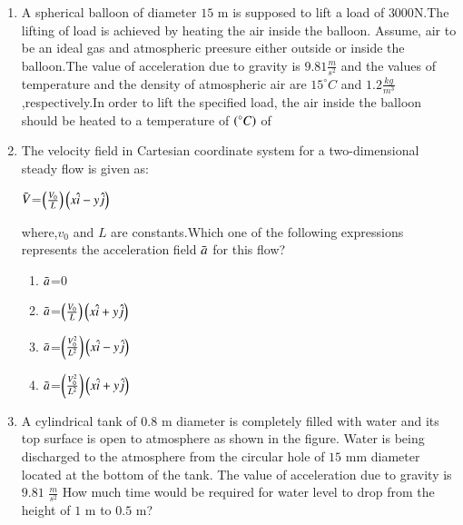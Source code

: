 \documentclass[journal]{IEEEtran}
\begin{document}
\begin{enumerate}[start=14]
    \item A spherical balloon of diameter $15$ m is supposed to lift a load of $3000$N.The lifting of load is achieved by heating the air inside the balloon. Assume, air to be an ideal gas and atmospheric preesure either outside or inside the balloon.The value of acceleration due to gravity is $9.81\frac{m}{s^2}$ and the values of temperature and the density of atmospheric air are $15^\circ C$ and $1.2\frac{kg}{m^3}$,respectively.In order to lift the specified load, the air inside the balloon should be heated to a temperature of $\left(^\circ C\right)$ of    
    \item The velocity field in Cartesian coordinate system for a two-dimensional steady flow is given as:\\
    \begin{center}
        $\Bar{V}$=$\left(\frac{V_{0}}{L}\right)\left(x\hat{i}-y\hat{j}\right)$
    \end{center}
    where,$v_{0}$ and $L$ are constants.Which one of the following expressions represents the acceleration field $\Bar{a}$ for this flow?
    \begin{enumerate}
        \item $\Bar{a}$=$0$
        \item $\Bar{a}$=$\left(\frac{V_{0}}{L}\right)\left(x\hat{i}+y\hat{j}\right)$
        \item $\Bar{a}$=$\left(\frac{V^2_{0}}{L^2}\right)\left(x\hat{i}-y\hat{j}\right)$
        \item $\Bar{a}$=$\left(\frac{V^2_{0}}{L^2}\right)\left(x\hat{i}+y\hat{j}\right)$
    \end{enumerate}
    \item A cylindrical tank of $0.8$ m diameter is completely filled with water and its top surface is open to atmosphere as shown in the figure. Water is being discharged to the atmosphere from the circular hole of $15$ mm diameter located at the bottom of the tank. The value of acceleration due to gravity is $9.81$ $\frac{m}{s^2}$ How much time  would be required for water level to drop from the height of $1$ m to $0.5$ m?\\
\end{enumerate}
\end{document}
